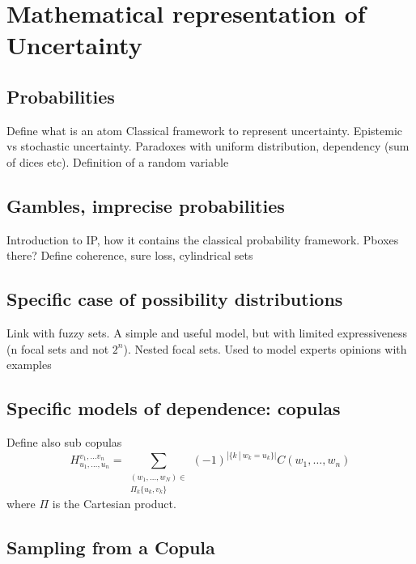 \chapter{Mathematical representation of Uncertainty}


\section{Probabilities}
Define what is an atom
Classical framework to represent uncertainty. Epistemic vs stochastic uncertainty. Paradoxes with uniform distribution, dependency (sum of dices etc). Definition of a random variable \etc
\section{Gambles, imprecise probabilities}
Introduction to IP, how it contains the classical probability framework. Pboxes there?
Define coherence, sure loss, cylindrical sets
\section{Specific case of possibility distributions}
Link with fuzzy sets. A simple and useful model, but with limited expressiveness (n focal sets and not $2^n$). Nested focal sets. Used to model experts opinions with examples \cite{baudrit_joint_2007}

\section{Specific models of dependence: copulas}\label{sec:copulas}
Define also sub copulas
\begin{equation}\label{eq:hvolume}
   H^{v_1,\dots v_n}_{u_1,\dots,u_n}=\sum_{\substack{(w_1, \dots, w_N)\in\\\Pi_k\{u_k, v_k\}}}(-1)^{|\{k~|~w_k=u_k\}|}C(w_1, \dots, w_n)
\end{equation}
where $\Pi$ is the Cartesian product. 
\section{Sampling from a Copula}

\pagebreak